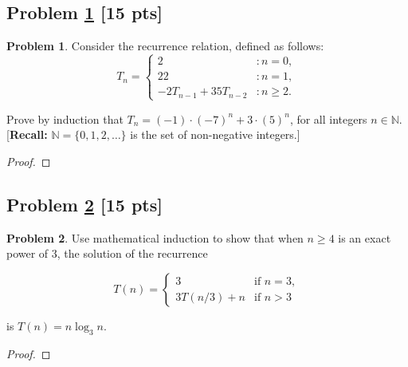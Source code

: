 \documentclass[11pt]{article}
\theoremstyle{definition}
\theoremstyle{definition}
\newtheorem{required}{Problem}
\theoremstyle{definition}
\begin{document}
\newpage
\subsection{Problem \ref{Induction2} \textbf{[15 pts]}} 
\begin{required} \label{Induction2}
Consider the recurrence relation, defined as follows:
\[
T_{n} = \begin{cases} 2 & : n = 0, \\
22 & : n = 1, \\
-2 T_{n-1} + 35 T_{n-2} & : n \geq 2.
\end{cases}
\]

\noindent Prove by induction that $T_{n} = (-1) \cdot (-7)^{n} + 3 \cdot (5)^{n}$, for all integers $n \in \mathbb{N}$. [\textbf{Recall:} $\mathbb{N} = \{0, 1, 2, \ldots \}$ is the set of non-negative integers.]
\end{required}

\begin{proof}
\end{proof}

\newpage
\subsection{Problem \ref{Induction3} \textbf{[15 pts]}}
\begin{required} \label{Induction3}
Use mathematical induction to show that when \( n \geq 4 \) is an exact power of 3, the solution of the recurrence

\[
T(n) = 
\begin{cases} 
3 & \text{if } n = 3, \\
3T(n/3) + n & \text{if } n > 3
\end{cases}
\]

is \( T(n) = n \log_3 n \).
\end{required}

\begin{proof}
\end{proof}

\newpage
\end{document}
